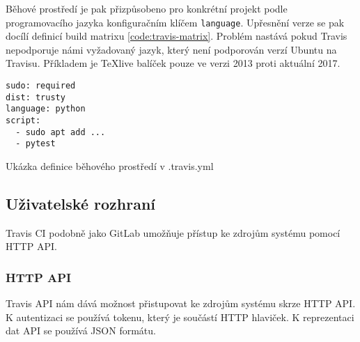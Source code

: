 Běhové prostředí je pak přizpůsobeno pro konkrétní projekt podle programovacího jazyka konfiguračním klíčem \verb|language|.
Upřesnění verze se pak docílí definicí build matrixu \ref{code:travis-matrix}.
Problém nastává pokud Travis nepodporuje námi vyžadovaný jazyk, který není podporován verzí Ubuntu na Travisu.
Příkladem je \TeX{}live balíček pouze ve verzi 2013 proti aktuální 2017.

\begin{listing}[ht]
\begin{verbatim}
sudo: required
dist: trusty
language: python
script:
  - sudo apt add ...
  - pytest
\end{verbatim}
\caption{Ukázka definice běhového prostředí v .travis.yml}
\end{listing}

\subsection{Uživatelské rozhraní}

Travis CI podobně jako GitLab umožňuje přístup ke zdrojům systému pomocí HTTP API.

\subsubsection{HTTP API}

Travis API nám dává možnost přistupovat ke zdrojům systému skrze HTTP API.
K autentizaci se používá tokenu, který je součástí HTTP hlaviček.
K reprezentaci dat API se používá JSON formátu.

